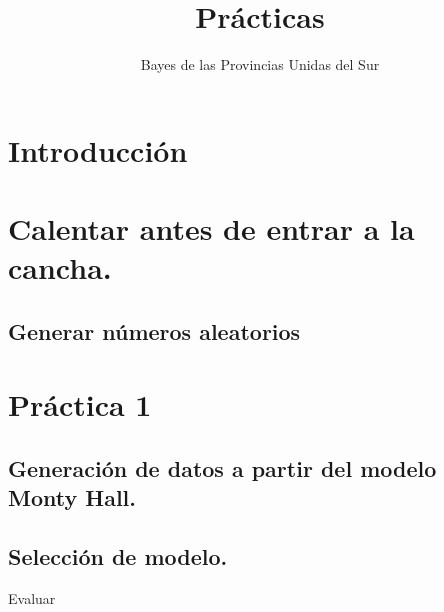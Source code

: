 \documentclass[a4paper,10pt]{article}
\title{Prácticas}
\author{Bayes de las Provincias Unidas del Sur}
\begin{document}
\maketitle

\tableofcontents

\section*{Introducción}

\section{Calentar antes de entrar a la cancha.}

\subsection{Generar números aleatorios}

\subsubsection{}

\section{Práctica 1}

\subsection{Generación de datos a partir del modelo Monty Hall.}

\subsection{Selección de modelo.}

Evaluar
\end{document}
